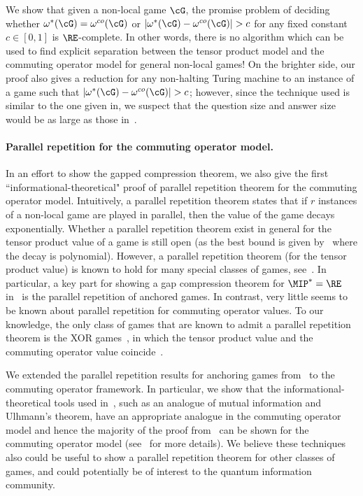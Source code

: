We show that given a non-local game $\cG$, the promise problem of deciding whether $\omega^*(\cG) = \omega^{co}(\cG)$ or $|\omega^*(\cG) - \omega^{co}(\cG)| > c$ for any fixed constant $c \in [0,1]$ is $\RE$-complete. In other words, there is no algorithm which can be used to find explicit separation between the tensor product model and the commuting operator model for general non-local games! On the brighter side, our proof also gives a reduction for any non-halting Turing machine to an instance of a game such that $|\omega^*(\cG) - \omega^{co}(\cG)| > c$; however, since the technique used is similar to the one given in\cite[Theorem 12.10]{jiMIPRE2022a}, we suspect that the question size and answer size would be as large as those in~\cite{jiMIPRE2022a}.

\paragraph{Parallel repetition for the commuting operator model. } In an effort to show the gapped compression theorem, we also give the first ``informational-theoretical" proof of parallel repetition theorem for the commuting operator model. Intuitively, a parallel repetition theorem states that if $r$ instances of a non-local game are played in parallel, then the value of the game decays exponentially. Whether a parallel repetition theorem exist in general for the tensor product value of a game is still open (as the best bound is given by~\cite{yuenParallelRepetitionTheorem2016} where the decay is polynomial). However, a parallel repetition theorem (for the tensor product value) is known to hold for many special classes of games, see~\cite{cleveStrongParallelRepetition2008, kempeParallelRepetitionEntangled2011, jainParallelRepetitionTheorem2014, chaillouxParallelRepetitionFree2015, chungParallelRepetitionEntangled2015, dinurParallelRepetitionTheorem2015, bavarianAnchoredParallelRepetition2021}. In particular, a key part for showing a gap compression theorem for $\MIP^*=\RE$ in~\cite{jiMIPRE2022a} is the parallel repetition of anchored games. In contrast, very little seems to be known about parallel repetition for commuting operator values. To our knowledge, the only class of games that are known to admit a parallel repetition theorem is the XOR games~\cite{cleveStrongParallelRepetition2008}, in which the tensor product value and the commuting operator value coincide~\cite{tsirelsonQuantumAnaloguesBell1987}. 

We extended the parallel repetition results for anchoring games from~\cite{bavarianAnchoredParallelRepetition2021} to the commuting operator framework. In particular, we show that the informational-theoretical tools used in~\cite{bavarianAnchoredParallelRepetition2021}, such as an analogue of mutual information and Ulhmann's theorem, have an appropriate analogue in the commuting operator model and hence the majority of the proof from~\cite{bavarianAnchoredParallelRepetition2021} can be shown for the commuting operator model (see~ for more details). We believe these techniques also could be useful to show a parallel repetition theorem for other classes of games, and could potentially be of interest to the quantum information community. 

